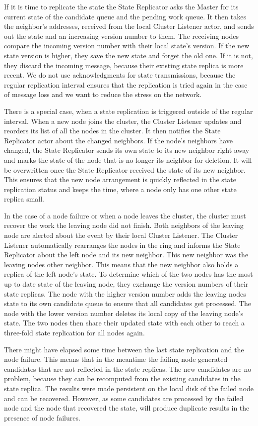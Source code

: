   If it is time to replicate the state the State Replicator asks the Master for its current state of the candidate queue and the pending work queue.
  It then takes the neighbor's addresses, received from the local Cluster Listener actor, and sends out the state and an increasing version number to them.
  The receiving nodes compare the incoming version number with their local state's version.
  If the new state version is higher, they save the new state and forget the old one.
  If it is not, they discard the incoming message, because their existing state replica is more recent.
  We do not use acknowledgments for state transmissions, because the regular replication interval ensures that the replication is tried again in the case of message loss and we want to reduce the stress on the network.

  There is a special case, when a state replication is triggered outside of the regular interval.
  When a new node joins the cluster, the Cluster Listener updates and reorders its list of all the nodes in the cluster.
  It then notifies the State Replicator actor about the changed neighbors.
  If the node's neighbors have changed, the State Replicator sends its own state to its new neighbor right away and marks the state of the node that is no longer its neighbor for deletion.
  It will be overwritten once the State Replicator received the state of its new neighbor.
  This ensures that the new node arrangement is quickly reflected in the state replication status and keeps the time, where a node only has one other state replica small.

  In the case of a node failure or when a node leaves the cluster, the cluster must recover the work the leaving node did not finish.
  Both neighbors of the leaving node are alerted about the event by their local Cluster Listener.
  The Cluster Listener automatically rearranges the nodes in the ring and informs the State Replicator about the left node and its new neighbor.
  This new neighbor was the leaving nodes other neighbor.
  This means that the new neighbor also holds a replica of the left node's state.
  To determine which of the two nodes has the most up to date state of the leaving node, they exchange the version numbers of their state replicas.
  The node with the higher version number adds the leaving nodes state to its own candidate queue to ensure that all candidates get processed.
  The node with the lower version number deletes its local copy of the leaving node's state.
  The two nodes then share their updated state with each other to reach a three-fold state replication for all nodes again.

  There might have elapsed some time between the last state replication and the node failure.
  This means that in the meantime the failing node generated candidates that are not reflected in the state replicas.
  The new candidates are no problem, because they can be recomputed from the existing candidates in the state replica.
  The results were made persistent on the local disk of the failed node and can be recovered.
  However, as some candidates are processed by the failed node and the node that recovered the state, \dodo{} will produce duplicate results in the presence of node failures.

